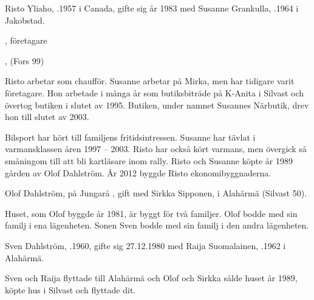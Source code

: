 
Risto Yliaho, .1957 i Canada, gifte sig år 1983 med Susanne Grankulla, .1964 i Jakobstad.
\begin{jhchildren}
  \item {}, företagare
  \item {}, (Fors 99)
\end{jhchildren}

Risto arbetar som chaufför. Susanne arbetar på Mirka, men har tidigare varit företagare. Hon arbetade i många år som butiksbiträde på K-Anita i Silvast och övertog butiken i slutet av 1995. Butiken, under namnet Susannes Närbutik, drev hon till slutet av 2003.

Bilsport har hört till familjens fritidsintressen. Susanne har tävlat i varmansklassen åren 1997 – 2003. Risto har också kört varmans, men övergick så småningom till att bli kartläsare inom rally. Risto och Susanne köpte år 1989 gården av Olof Dahlström. År 2012 byggde Risto ekonomibyggnaderna.


Olof Dahlström,  på Jungarå , gift med Sirkka Sipponen,  i Alahärmä (Silvast 50).
\begin{jhchildren}
  \item {}
  \item {}
  \item {}
\end{jhchildren}
Huset, som Olof byggde år 1981, är byggt för två familjer. Olof bodde med sin familj i ena lägenheten. Sonen Sven bodde med sin familj i den andra lägenheten.

Sven Dahlström, .1960, gifte sig 27.12.1980 med Raija Suomalainen, .1962 i Alahärmä.
\begin{jhchildren}
  \item {}
  \item {}
\end{jhchildren}
Sven och Raija flyttade till Alahärmä och Olof och Sirkka sålde huset år 1989, köpte hus i Silvast och flyttade dit.




